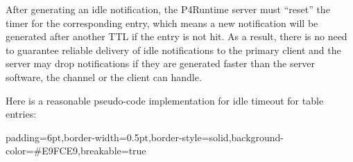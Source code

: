 \documentclass[11pt]{article}
\begin{document}
{%
After generating an idle notification, the P4Runtime server must \textquotedblleft{}reset\textquotedblright{} the
timer for the corresponding entry, which means a new notification will be
generated after another TTL if the entry is not hit. As a result, there is no
need to guarantee reliable delivery of idle notifications to the primary client
and the server may drop notifications if they are generated faster than the
server software, the channel or the client can handle.%

Here is a reasonable pseudo-code implementation for idle timeout for table
entries:%

\begin{mdbmargintb}{6pt}{6pt}%
\begin{mdblock}{padding=6pt,border-width=0.5pt,border-style=solid,background-color=\#E9FCE9,breakable=true}%
\begin{mdpre}%
\end{mdpre}
\end{mdblock}
\end{mdbmargintb}}
\end{document}
